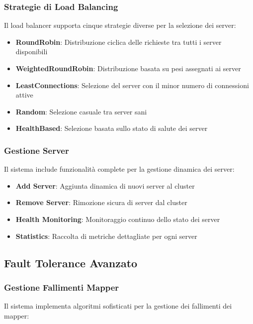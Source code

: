 \documentclass[12pt,a4paper]{article}
\begin{document}
\subsubsection{Strategie di Load Balancing}

Il load balancer supporta cinque strategie diverse per la selezione dei server:

\begin{itemize}
\item \textbf{RoundRobin}: Distribuzione ciclica delle richieste tra tutti i server disponibili
\item \textbf{WeightedRoundRobin}: Distribuzione basata su pesi assegnati ai server
\item \textbf{LeastConnections}: Selezione del server con il minor numero di connessioni attive
\item \textbf{Random}: Selezione casuale tra server sani
\item \textbf{HealthBased}: Selezione basata sullo stato di salute dei server
\end{itemize}

\subsubsection{Gestione Server}

Il sistema include funzionalità complete per la gestione dinamica dei server:

\begin{itemize}
\item \textbf{Add Server}: Aggiunta dinamica di nuovi server al cluster
\item \textbf{Remove Server}: Rimozione sicura di server dal cluster
\item \textbf{Health Monitoring}: Monitoraggio continuo dello stato dei server
\item \textbf{Statistics}: Raccolta di metriche dettagliate per ogni server
\end{itemize}

\subsection{Fault Tolerance Avanzato}

\subsubsection{Gestione Fallimenti Mapper}

Il sistema implementa algoritmi sofisticati per la gestione dei fallimenti dei mapper:
\end{document}
